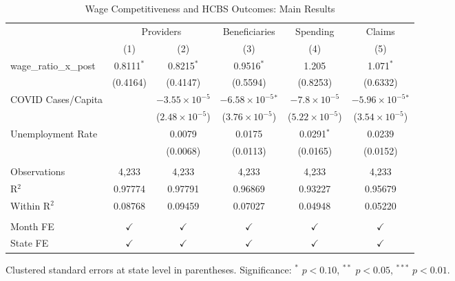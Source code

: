 
\begin{table}[htbp]
   \caption{\label{tab:main} Wage Competitiveness and HCBS Outcomes: Main Results}
   \bigskip
   \centering
   \begin{tabular}{lccccc}
      \toprule
       & \multicolumn{2}{c}{Providers} & Beneficiaries & Spending & Claims \\ 
                              & (1)           & (2)                     & (3)                          & (4)                     & (5)\\  
      \midrule 
      wage\_ratio\_x\_post    & 0.8111$^{*}$  & 0.8215$^{*}$            & 0.9516$^{*}$                 & 1.205                   & 1.071$^{*}$\\   
                              & (0.4164)      & (0.4147)                & (0.5594)                     & (0.8253)                & (0.6332)\\   
      COVID Cases/Capita      &               & $-3.55\times 10^{-5}$   & $-6.58\times 10^{-5}$$^{*}$  & $-7.8\times 10^{-5}$    & $-5.96\times 10^{-5}$$^{*}$\\    
                              &               & ($2.48\times 10^{-5}$)  & ($3.76\times 10^{-5}$)       & ($5.22\times 10^{-5}$)  & ($3.54\times 10^{-5}$)\\    
      Unemployment Rate       &               & 0.0079                  & 0.0175                       & 0.0291$^{*}$            & 0.0239\\   
                              &               & (0.0068)                & (0.0113)                     & (0.0165)                & (0.0152)\\   
       \\
      Observations            & 4,233         & 4,233                   & 4,233                        & 4,233                   & 4,233\\  
      R$^2$                   & 0.97774       & 0.97791                 & 0.96869                      & 0.93227                 & 0.95679\\  
      Within R$^2$            & 0.08768       & 0.09459                 & 0.07027                      & 0.04948                 & 0.05220\\  
       \\
      Month FE                & $\checkmark$  & $\checkmark$            & $\checkmark$                 & $\checkmark$            & $\checkmark$\\   
      State FE                & $\checkmark$  & $\checkmark$            & $\checkmark$                 & $\checkmark$            & $\checkmark$\\   
      \bottomrule
   \end{tabular}
   
   \par \raggedright 
   Clustered standard errors at state level in parentheses. Significance: $^{*}$ $p<0.10$, $^{**}$ $p<0.05$, $^{***}$ $p<0.01$.
\end{table}


